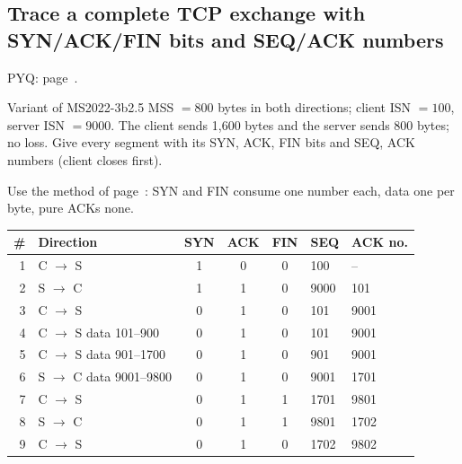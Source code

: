 \subsection{Trace a complete TCP exchange with SYN/ACK/FIN bits and SEQ/ACK numbers}\label{iq:C33}
     \quad PYQ: page~\pageref{q:MS2022-3b}.
\begin{question}{Variant of MS2022-3b}{2.5}
MSS $=800$ bytes in both directions; client ISN $=100$, server ISN $=9000$. The client sends 1,600 bytes and the server sends 800 bytes; no loss. Give every segment with its SYN, ACK, FIN bits and SEQ, ACK numbers (client closes first).
\end{question}
\begin{solution}[outline]
Use the method of page~\pageref{iq:C32}: SYN and FIN consume one number each, data one per byte, pure ACKs none. 
\begin{center}\footnotesize\zebra
\begin{tabular}{rlcccll}\toprule
\# & Direction & SYN & ACK & FIN & SEQ & ACK no.\\\midrule
1 & C $\to$ S & 1 & 0 & 0 & 100 & --\\
2 & S $\to$ C & 1 & 1 & 0 & 9000 & 101\\
3 & C $\to$ S & 0 & 1 & 0 & 101 & 9001\\
4 & C $\to$ S data 101--900 & 0 & 1 & 0 & 101 & 9001\\
5 & C $\to$ S data 901--1700 & 0 & 1 & 0 & 901 & 9001\\
6 & S $\to$ C data 9001--9800 & 0 & 1 & 0 & 9001 & 1701\\
7 & C $\to$ S & 0 & 1 & 1 & 1701 & 9801\\
8 & S $\to$ C & 0 & 1 & 1 & 9801 & 1702\\
9 & C $\to$ S & 0 & 1 & 0 & 1702 & 9802\\\bottomrule
\end{tabular}\end{center}
\end{solution}

